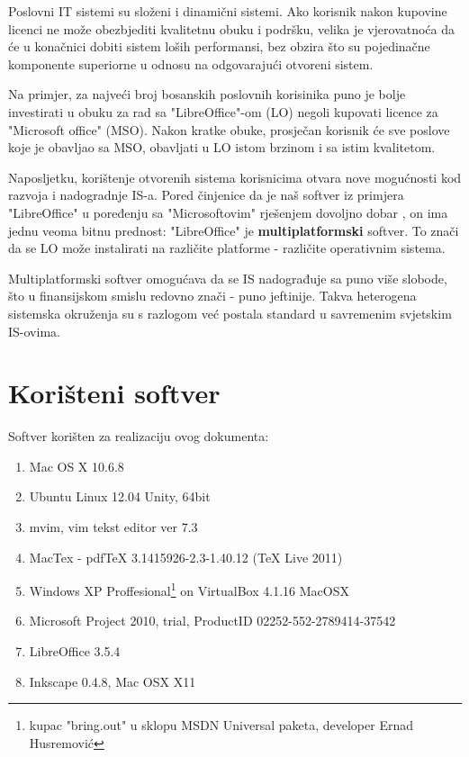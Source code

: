 \documentclass[times, utf8, seminar]{fit}
\begin{document}
Poslovni IT sistemi su složeni i dinamični sistemi. Ako korisnik nakon kupovine licenci ne može obezbjediti kvalitetnu obuku i podršku, velika je vjerovatnoća da će u konačnici dobiti sistem loših performansi, bez obzira što su pojedinačne komponente superiorne u odnosu na odgovarajući otvoreni sistem.

Na primjer, za najveći broj bosanskih poslovnih korisinika puno je bolje investirati u obuku za rad sa "LibreOffice"-om (LO) negoli kupovati licence za "Microsoft office" (MSO). Nakon kratke obuke, prosječan korisnik će sve poslove koje je obavljao sa MSO, obavljati u LO istom brzinom i sa istim kvalitetom.

Naposljetku, korištenje otvorenih sistema korisnicima otvara nove mogućnosti kod razvoja i nadogradnje IS-a.
Pored činjenice da je naš softver iz primjera "LibreOffice" u poređenju sa "Microsoftovim" rješenjem dovoljno dobar , on ima jednu veoma bitnu prednost: "LibreOffice" je \textbf{multiplatformski} softver. To znači da se LO može instalirati na različite platforme - različite operativnim sistema.

Multiplatformski softver omogućava da se IS nadograđuje sa puno više slobode, što u finansijskom smislu redovno znači - puno jeftinije. Takva heterogena sistemska okruženja su s razlogom već postala standard u savremenim svjetskim IS-ovima.  




\appendix

\chapter{Korišteni softver}
Softver korišten za realizaciju ovog dokumenta:
\begin{enumerate}
  \item Mac OS X 10.6.8
  \item Ubuntu Linux 12.04 Unity, 64bit
  \item mvim, vim tekst editor ver 7.3
  \item MacTex - pdfTeX 3.1415926-2.3-1.40.12 (TeX Live 2011)
  \item Windows XP Proffesional\footnote{kupac "bring.out" u sklopu MSDN Universal paketa, developer Ernad Husremović} on VirtualBox 4.1.16 MacOSX 
  \item Microsoft Project 2010, trial, ProductID 02252-552-2789414-37542
  \item LibreOffice 3.5.4
  \item Inkscape 0.4.8, Mac OSX X11
\end{enumerate}
\end{document}
